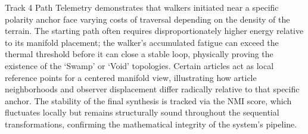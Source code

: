 Track 4 Path Telemetry demonstrates that walkers initiated near a specific polarity anchor face varying costs of traversal depending on the density of the terrain. The starting path often requires disproportionately higher energy relative to its manifold placement; the walker's accumulated fatigue can exceed the thermal threshold before it can close a stable loop, physically proving the existence of the `Swamp' or `Void' topologies. Certain articles act as local reference points for a centered manifold view, illustrating how article neighborhoods and observer displacement differ radically relative to that specific anchor. The stability of the final synthesis is tracked via the NMI score, which fluctuates locally but remains structurally sound throughout the sequential transformations, confirming the mathematical integrity of the system's pipeline.
